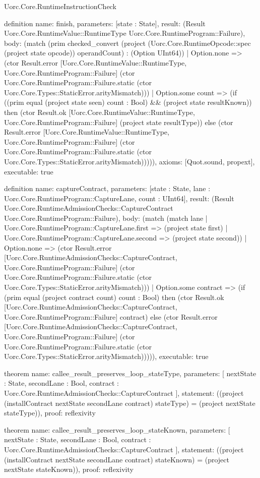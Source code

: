 \begin{lexlean}{Uorc.Core.RuntimeInstructionCheck}
\begin{semanticmodule}
definition{
  name: finish,
  parameters: [state : State],
  result: (Result Uorc.Core.RuntimeValue::RuntimeType Uorc.Core.RuntimeProgram::Failure),
  body: (match (prim checked_convert (project (Uorc.Core.RuntimeOpcode::spec (project state opcode)) operandCount) : (Option UInt64))
    | Option.none => (ctor Result.error [Uorc.Core.RuntimeValue::RuntimeType, Uorc.Core.RuntimeProgram::Failure] (ctor Uorc.Core.RuntimeProgram::Failure.static (ctor Uorc.Core.Types::StaticError.arityMismatch)))
    | Option.some count => (if ((prim equal (project state seen) count : Bool) && (project state resultKnown)) then (ctor Result.ok [Uorc.Core.RuntimeValue::RuntimeType, Uorc.Core.RuntimeProgram::Failure] (project state resultType)) else (ctor Result.error [Uorc.Core.RuntimeValue::RuntimeType, Uorc.Core.RuntimeProgram::Failure] (ctor Uorc.Core.RuntimeProgram::Failure.static (ctor Uorc.Core.Types::StaticError.arityMismatch))))),
  axioms: [Quot.sound, propext],
  executable: true
}

definition{
  name: captureContract,
  parameters: [state : State, lane : Uorc.Core.RuntimeProgram::CaptureLane, count : UInt64],
  result: (Result Uorc.Core.RuntimeAdmissionChecks::CaptureContract Uorc.Core.RuntimeProgram::Failure),
  body: (match (match lane
      | Uorc.Core.RuntimeProgram::CaptureLane.first => (project state first)
      | Uorc.Core.RuntimeProgram::CaptureLane.second => (project state second))
    | Option.none => (ctor Result.error [Uorc.Core.RuntimeAdmissionChecks::CaptureContract, Uorc.Core.RuntimeProgram::Failure] (ctor Uorc.Core.RuntimeProgram::Failure.static (ctor Uorc.Core.Types::StaticError.arityMismatch)))
    | Option.some contract => (if (prim equal (project contract count) count : Bool) then (ctor Result.ok [Uorc.Core.RuntimeAdmissionChecks::CaptureContract, Uorc.Core.RuntimeProgram::Failure] contract) else (ctor Result.error [Uorc.Core.RuntimeAdmissionChecks::CaptureContract, Uorc.Core.RuntimeProgram::Failure] (ctor Uorc.Core.RuntimeProgram::Failure.static (ctor Uorc.Core.Types::StaticError.arityMismatch))))),
  executable: true
}

theorem{
  name: callee_result_preserves_loop_stateType,
  parameters: [
    nextState : State,
    secondLane : Bool,
    contract : Uorc.Core.RuntimeAdmissionChecks::CaptureContract
  ],
  statement: ((project (installContract nextState secondLane contract) stateType) = (project nextState stateType)),
  proof: reflexivity{}
}

theorem{
  name: callee_result_preserves_loop_stateKnown,
  parameters: [
    nextState : State,
    secondLane : Bool,
    contract : Uorc.Core.RuntimeAdmissionChecks::CaptureContract
  ],
  statement: ((project (installContract nextState secondLane contract) stateKnown) = (project nextState stateKnown)),
  proof: reflexivity{}
}
\end{semanticmodule}
\end{lexlean}
